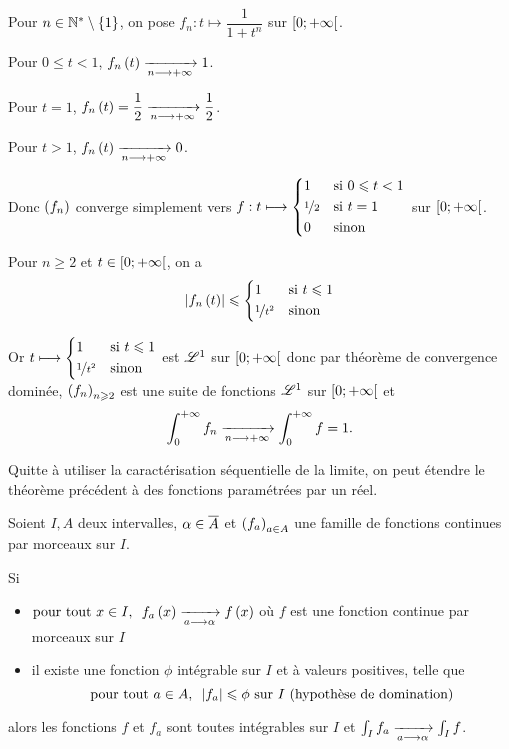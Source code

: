 \begin{corr}
Pour \(n\in\Ns\excluant\accol{1}\), on pose \(f_n:t\mapsto\dfrac{1}{1+t^n}\) sur \(\intervie{0}{\pinf}\).

Pour \(0\leq t<1\), \(f_n\paren{t}\tendqd{n\to\pinf}1\).

Pour \(t=1\), \(f_n\paren{t}=\dfrac{1}{2}\tendqd{n\to\pinf}\dfrac{1}{2}\).

Pour \(t>1\), \(f_n\paren{t}\tendqd{n\to\pinf}0\).

Donc \(\paren{f_n}\) converge simplement vers \(f:t\mapsto\begin{dcases}
    1 &\text{si }0\leq t<1 \\
    \nicefrac{1}{2} &\text{si }t=1 \\
    0 &\text{sinon}
\end{dcases}\) sur \(\intervie{0}{\pinf}\).

Pour \(n\geq2\) et \(t\in\intervie{0}{\pinf}\), on a \[\abs{f_n\paren{t}}\leq\begin{dcases}
    1 &\text{si }t\leq1 \\
    \nicefrac{1}{t^2} &\text{sinon}
\end{dcases}\]

Or \(t\mapsto\begin{dcases}
    1 &\text{si }t\leq1 \\
    \nicefrac{1}{t^2} &\text{sinon}
\end{dcases}\) est \(\integ{1}{}{}\) sur \(\intervie{0}{\pinf}\) donc par théorème de convergence dominée, \(\paren{f_n}_{n\geq2}\) est une suite de fonctions \(\integ{1}{}{}\) sur \(\intervie{0}{\pinf}\) et \[\int_0^{\pinf}f_n\tendqd{n\to\pinf}\int_0^{\pinf}f=1.\]
\end{corr}

Quitte à utiliser la caractérisation séquentielle de la limite, on peut étendre le théorème précédent à des fonctions paramétrées par un réel.

\begin{theo}
Soient \(I,A\) deux intervalles, \(\alpha\in\conj{A}\) et \(\paren{f_a}_{a\in A}\) une famille de fonctions continues par morceaux sur \(I\).

Si

\begin{itemize}
    \item \(\quantifs{\tpt x\in I}f_a\paren{x}\tendqd{a\to\alpha}f\paren{x}\) où \(f\) est une fonction continue par morceaux sur \(I\) \\
    \item il existe une fonction \(\phi\) intégrable sur \(I\) et à valeurs positives, telle que \[\quantifs{\tpt a\in A}\abs{f_a}\leq\phi\text{ sur \(I\) (hypothèse de domination)}\]
\end{itemize}

alors les fonctions \(f\) et \(f_a\) sont toutes intégrables sur \(I\) et \(\int_If_a\tendqd{a\to\alpha}\int_If\).
\end{theo}

